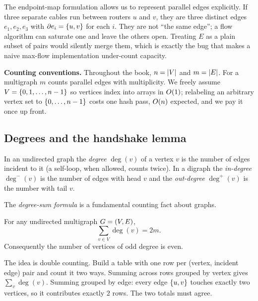 The endpoint-map formulation allows us to represent parallel edges explicitly. If three separate cables run between routers $u$
and $v$, they are three distinct edges $e_1, e_2, e_3$ with
$\partial e_i = \{u,v\}$ for each $i$. They are not ``the same edge''; a flow
algorithm can saturate one and leave the others open. Treating $E$ as a plain
subset of pairs would silently merge them, which is exactly the bug that makes a
naive max-flow implementation under-count capacity.

\begin{formalbox}
\textbf{Counting conventions.} Throughout the book, $n = \lvert V\rvert$ and
$m = \lvert E\rvert$. For a multigraph $m$ counts parallel edges with multiplicity. We
freely assume $V = \{0,1,\dots,n-1\}$ so vertices index into arrays in
$O(1)$; relabeling an arbitrary vertex set to $\{0,\dots,n-1\}$ costs one
hash pass, $O(n)$ expected, and we pay it once up front.
\end{formalbox}

\subsection{Degrees and the handshake lemma}

\begin{definition}[Degree]
\label{ch01:def-degree}
In an undirected graph the \emph{degree} $\deg(v)$ of a vertex $v$ is the number
of edges incident to it (a self-loop, when allowed, counts twice). In a digraph
the \emph{in-degree} $\deg^-(v)$ is the number of edges with head $v$ and the
\emph{out-degree} $\deg^+(v)$ is the number with tail $v$.
\end{definition}

The \emph{degree-sum formula} is a fundamental counting fact about graphs.

\begin{theorem}
\label{ch01:handshake}
For any undirected multigraph $G = (V,E)$,
\[
  \sum_{v \in V} \deg(v) = 2m.
\]
Consequently the number of vertices of odd degree is even.
\end{theorem}

\begin{whybox}
The idea is double counting. Build a table with one row per (vertex, incident
edge) pair and count it two ways. Summing across rows grouped by vertex gives
$\sum_v \deg(v)$. Summing grouped by edge: every edge $\{u,v\}$ touches
exactly two vertices, so it contributes exactly $2$ rows. The two totals must
agree.
\end{whybox}

